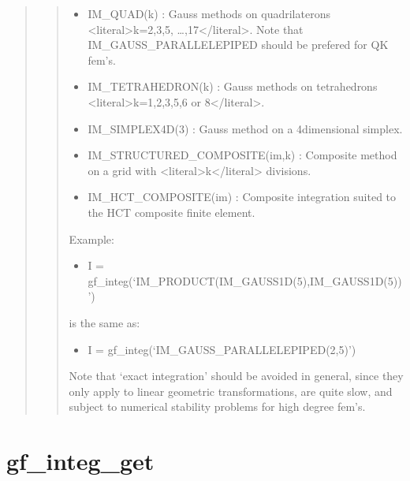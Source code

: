 \documentclass[a4paper,11pt,english]{sphinxmanual}
\begin{document}
\begin{quote}
\begin{quote}
\begin{itemize}
\item {} 
\sphinxAtStartPar
IM\_QUAD(k) :
Gauss methods on quadrilaterons \textless{}literal\textgreater{}k=2,3,5, …,17\textless{}/literal\textgreater{}. Note that
IM\_GAUSS\_PARALLELEPIPED should be prefered for QK fem’s.

\item {} 
\sphinxAtStartPar
IM\_TETRAHEDRON(k) :
Gauss methods on tetrahedrons \textless{}literal\textgreater{}k=1,2,3,5,6 or 8\textless{}/literal\textgreater{}.

\item {} 
\sphinxAtStartPar
IM\_SIMPLEX4D(3) :
Gauss method on a 4\sphinxhyphen{}dimensional simplex.

\item {} 
\sphinxAtStartPar
IM\_STRUCTURED\_COMPOSITE(im,k) :
Composite method on a grid with \textless{}literal\textgreater{}k\textless{}/literal\textgreater{} divisions.

\item {} 
\sphinxAtStartPar
IM\_HCT\_COMPOSITE(im) :
Composite integration suited to the HCT composite finite element.

\end{itemize}

\sphinxAtStartPar
Example:
\begin{itemize}
\item {} 
\sphinxAtStartPar
I = gf\_integ(‘IM\_PRODUCT(IM\_GAUSS1D(5),IM\_GAUSS1D(5))’)

\end{itemize}

\sphinxAtStartPar
is the same as:
\begin{itemize}
\item {} 
\sphinxAtStartPar
I = gf\_integ(‘IM\_GAUSS\_PARALLELEPIPED(2,5)’)

\end{itemize}

\sphinxAtStartPar
Note that ‘exact integration’ should be avoided in general, since they
only apply to linear geometric transformations, are quite slow, and
subject to numerical stability problems for high degree fem’s.
\end{quote}
\end{quote}


\section{gf\_integ\_get}
\label{\detokenize{scilab/cmdref_gf_integ_get:gf-integ-get}}\label{\detokenize{scilab/cmdref_gf_integ_get::doc}}
\sphinxAtStartPar
{}
\end{document}
